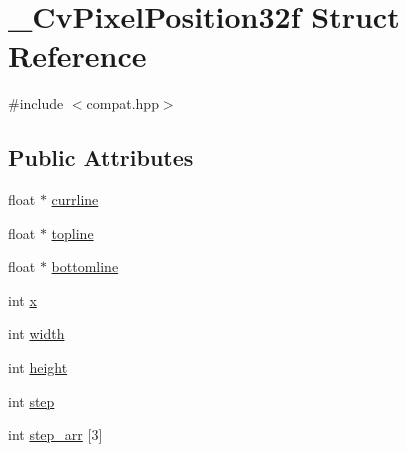 \hypertarget{struct__CvPixelPosition32f}{\section{\-\_\-\-Cv\-Pixel\-Position32f Struct Reference}
\label{struct__CvPixelPosition32f}
}


{\ttfamily \#include $<$compat.\-hpp$>$}

\subsection*{Public Attributes}
\begin{DoxyCompactItemize}
\item 
float $\ast$ \hyperlink{struct__CvPixelPosition32f_a39c536aa02db71838b8316bddb6cfe9f}{currline}
\item 
float $\ast$ \hyperlink{struct__CvPixelPosition32f_a5ae43c418cadbad887ee30df18844386}{topline}
\item 
float $\ast$ \hyperlink{struct__CvPixelPosition32f_acfb730c6fc6f6230223016f0187a7955}{bottomline}
\item 
int \hyperlink{struct__CvPixelPosition32f_a9918f352ab511119841330a1518f6919}{x}
\item 
int \hyperlink{struct__CvPixelPosition32f_a2ac704b751dc9dbb51d03ebceddf8967}{width}
\item 
int \hyperlink{struct__CvPixelPosition32f_a4ede97d4914e10744322ae3cc8f29e60}{height}
\item 
int \hyperlink{struct__CvPixelPosition32f_a06af85c75d5f0ec3adbe60b601653916}{step}
\item 
int \hyperlink{struct__CvPixelPosition32f_a9d72a429d3d0e26868000fe6fc033721}{step\-\_\-arr} \mbox{[}3\mbox{]}
\end{DoxyCompactItemize}


